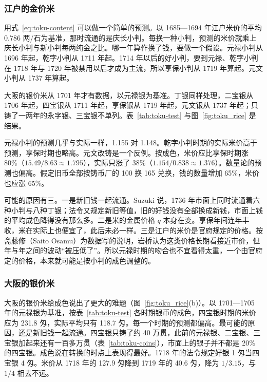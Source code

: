 \subsubsection{江户的金价米}
用式~\eqref{eq:toku-content} 可以做一个简单的预测。以 1685—1694 年江户米价的平均 0.786 两/石为基准，那时流通的是庆长小判。每换一种小判，预测的米价就乘上庆长小判与新小判每两纯金之比。哪一年算作换了钱，要做一个假设。元禄小判从 1696 年起，乾字小判从 1711 年起。1714 年以后的好小判，要到元禄、乾字小判在 1718 年与 1720 年被禁用以后才成为主流，所以享保小判从 1719 年算起。元文小判从 1737 年算起。

大阪的银价米从 1701 年才有数据，以元禄银为基准。丁银同样处理，二宝银从 1706 年起，四宝银从 1711 年起，享保银从 1719 年起，元文银从 1737 年起；只铸了一两年的永字银、三宝银不单列。表~\ref{tab:toku-test} 与图~\ref{fig:toku_rice} 是结果。

元禄小判的预测几乎与实际一样，1.155 对 1.148。乾字小判时期的实际米价高于预测，享保时期也略高。元文改铸是一个反例。按成色，米价应比享保时期涨 80\%（$15.49/8.63\approx1.795$），实际只涨了 38\%（$1.154/0.838\approx1.376$）。数量论的预测也偏高。假定旧币全部按铸币厂的 100 换 165 兑换，钱的数量增加 65\%，米价也应涨 65\%。

可能的原因有三。一是新旧钱一起流通。Suzuki 说，1736 年市面上同时流通着六种小判与八种丁银\cite{suzuki2021}；法令又规定新旧等值，旧的好钱没有全部换成新钱，市面上钱的平均成色降得没有那么多。二是米的金属价格 $q$ 本身在变。享保年间连年丰收，米在实际上也便宜了\cite{schaede1989}，此后未必一样。三是江户的米价是官府规定的价格。按斋藤修（Saito Osamu）为数据写的说明，岩桥认为这类价格长期看接近市价，但年与年之间的波动“被压低了”\cite{iwahashi1981}。所以元禄时期的吻合也不宜看得太重，一个由官府定的价格，本来就可能是按小判的成色调整的。


\subsubsection{大阪的银价米}
大阪的银价米给成色说出了更大的难题（图~\ref{fig:toku_rice}(b)）。以 1701—1705 年的元禄银为基准，按表~\ref{tab:toku-test} 各时期银币的成色，四宝银时期的米价应为 231.8 匁，实际平均只有 118.7 匁。每一个时期的预测都偏高。最可能的原因，还是新旧钱一起流通。四宝银只铸了约 40 万贯，此前的元禄银、二宝银、三宝银加起来还有一百多万贯（表~\ref{tab:toku-coins}），市面上的银子并不都是 20\% 的四宝银。成色说在转换的时点上表现得最好。1718 年的法令规定好银 1 匁当四宝银 4 匁。米价从 1718 年的 127.9 匁降到 1719 年的 40.6 匁，降为 $1/3.15$，与 $1/4$ 相去不远\cite{iwahashi1981,suzuki2021}。

